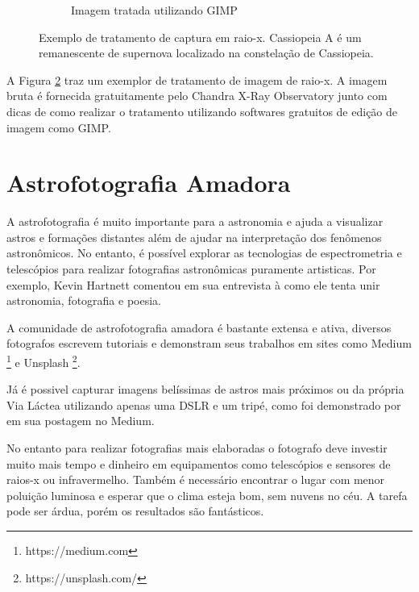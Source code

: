 \documentclass[
	article,			%
	12pt,				%
	oneside,			%
	a4paper,			%
	english,			%
	brazil,				%
	sumario=tradicional
	]{abntex2}
\begin{document}
\begin{figure}
\begin{subfigure}[hb]{0.45\textwidth}
        \caption{Imagem tratada utilizando GIMP}
        \label{fig:colorspace}
	\end{subfigure}
    \caption{Exemplo de tratamento de captura em raio-x. Cassiopeia A é um remanescente de supernova localizado na constelação de Cassiopeia.}\label{fig:example}
\end{figure}

A Figura \ref{fig:example} traz um exemplor de tratamento de imagem de raio-x.
A imagem bruta é fornecida gratuitamente pelo Chandra X-Ray Observatory junto
com dicas de como realizar o tratamento utilizando softwares gratuitos de edição
de imagem como GIMP. \cite{openfits}

\section{Astrofotografia Amadora}
\label{amauter}

A astrofotografia é muito importante para a astronomia e ajuda a visualizar
astros e formações distantes além de ajudar na interpretação dos fenômenos
astronômicos. No entanto, é possível explorar as tecnologias de espectrometria
e telescópios para realizar fotografias astronômicas puramente artisticas. Por
exemplo, Kevin Hartnett comentou em sua entrevista à
 como ele tenta unir astronomia, fotografia e
poesia.

A comunidade de astrofotografia amadora é bastante extensa e ativa, diversos
fotografos escrevem tutoriais e demonstram seus trabalhos em sites como Medium
\footnote{https://medium.com} e Unsplash \footnote{https://unsplash.com/}.

Já é possivel capturar imagens belíssimas de astros mais próximos ou da própria
Via Láctea utilizando apenas uma DSLR e um tripé, como foi demonstrado por
 em sua postagem no Medium.

No entanto para realizar fotografias mais elaboradas o fotografo deve investir
muito mais tempo e dinheiro em equipamentos como telescópios e sensores de
raios-x ou infravermelho. Também é necessário encontrar o lugar com menor
poluição luminosa e esperar que o clima esteja bom, sem nuvens no céu. A tarefa
pode ser árdua, porém os resultados são fantásticos.

% 

\end{document}
